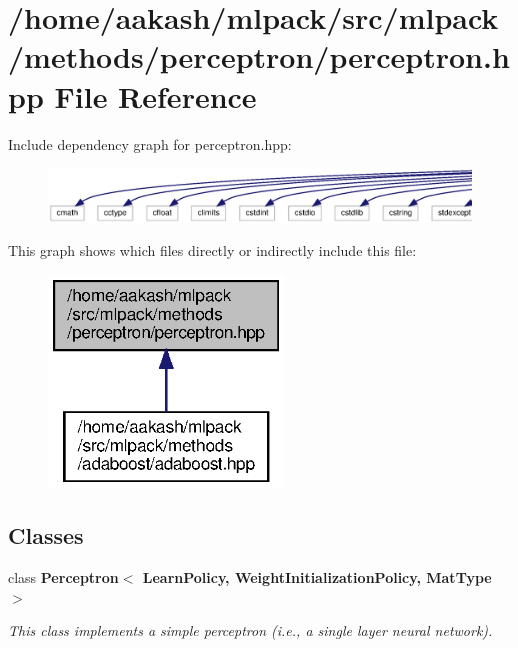 \section{/home/aakash/mlpack/src/mlpack/methods/perceptron/perceptron.hpp File Reference}
\label{perceptron_8hpp}
Include dependency graph for perceptron.\+hpp\+:
\nopagebreak
\begin{figure}[H]
\begin{center}
\leavevmode
\includegraphics[width=350pt]{perceptron_8hpp__incl}
\end{center}
\end{figure}
This graph shows which files directly or indirectly include this file\+:
\nopagebreak
\begin{figure}[H]
\begin{center}
\leavevmode
\includegraphics[width=177pt]{perceptron_8hpp__dep__incl}
\end{center}
\end{figure}
\subsection*{Classes}
\begin{DoxyCompactItemize}
\item 
class \textbf{ Perceptron$<$ Learn\+Policy, Weight\+Initialization\+Policy, Mat\+Type $>$}
\begin{DoxyCompactList}\small\item\em This class implements a simple perceptron (i.\+e., a single layer neural network). \end{DoxyCompactList}\end{DoxyCompactItemize}
